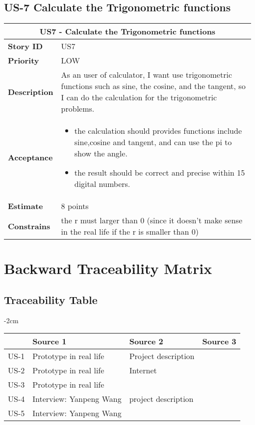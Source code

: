 \documentclass[12pt]{report}
\begin{document}
{		\section{US-7 Calculate the Trigonometric functions}
		\begin{tabular}{ |p{4cm}|p{10cm}| }
			\hline
			\multicolumn{2}{|c|}{US7 - Calculate the Trigonometric functions} \\
			\hline
			\textbf {Story ID}& US7 \\
			\hline
			\textbf{Priority} & LOW \\
			\hline
			\textbf{Description}   & As an user of calculator, I want use trigonometric functions such as sine, the cosine, and the tangent, so I can do the calculation for the trigonometric problems.
			\\
			\hline
			\textbf{Acceptance}&
			\begin{itemize}
				\item  the calculation should provides functions include sine,cosine and tangent, and can use the pi to show the angle.
				\item  the result should be correct and precise within 15 digital numbers.
			\end{itemize}
			\\
			\hline
			\textbf{Estimate} & 8 points\\
			\hline
			\textbf{Constrains}& the r must larger than 0 (since it doesn't make sense in the real life if the r is smaller than 0)   \\
			\hline
		\end{tabular}
		
		\chapter{Backward Traceability Matrix } 
		
		\section{Traceability Table}
		\begin{table}[!ht]
			\centering
			\addtolength{\leftskip} {-2cm}
			\addtolength{\rightskip}{-2cm}
			
			\begin{tabular}{|p{2cm}|p{4cm}|p{4cm}|p{4cm}|}
				
				\hline
				& Source 1& Source 2 & Source 3 \\
				\hline
				US-1 & Prototype in real life & Project description& \\
				\hline
				US-2 & Prototype in real life&Internet&\\
				\hline
				US-3& Prototype in real life&&\\
				\hline
				US-4& Interview: Yanpeng Wang&project description& \\
				\hline
				US-5& Interview: Yanpeng Wang &&\\
				\hline
				

\end{tabular}
\end{table}}
\end{document}
